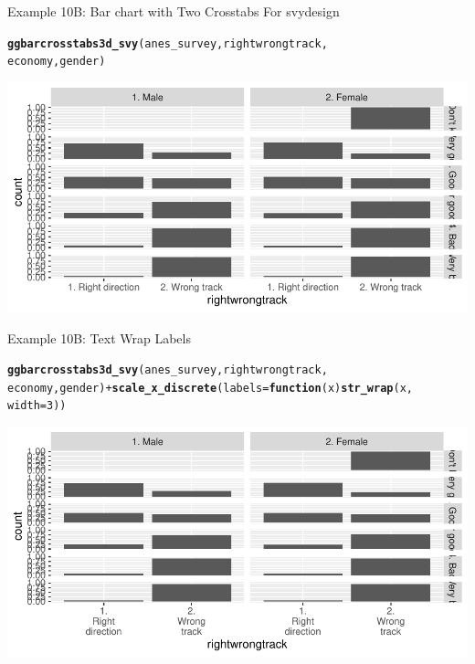 \documentclass{beamer}\usepackage[]{graphicx}\usepackage[]{color}
\makeatletter
\newcommand{\hlnum}[1]{\textcolor[rgb]{0.686,0.059,0.569}{#1}}%
\newcommand{\hlopt}[1]{\textcolor[rgb]{0,0,0}{#1}}%
\newcommand{\hlstd}[1]{\textcolor[rgb]{0.345,0.345,0.345}{#1}}%
\newcommand{\hlkwa}[1]{\textcolor[rgb]{0.161,0.373,0.58}{\textbf{#1}}}%
\newcommand{\hlkwc}[1]{\textcolor[rgb]{0.333,0.667,0.333}{#1}}%
\newcommand{\hlkwd}[1]{\textcolor[rgb]{0.737,0.353,0.396}{\textbf{#1}}}%
\newenvironment{kframe}{%
 \def\at@end@of@kframe{}%
 \ifinner\ifhmode%
  \def\at@end@of@kframe{\end{minipage}}%
  \begin{minipage}{\columnwidth}%
 \fi\fi%
 \def\FrameCommand##1{\hskip\@totalleftmargin \hskip-\fboxsep
 \colorbox{shadecolor}{##1}\hskip-\fboxsep
     \hskip-\linewidth \hskip-\@totalleftmargin \hskip\columnwidth}%
 \MakeFramed {\advance\hsize-\width
   \@totalleftmargin\z@ \linewidth\hsize
   \@setminipage}}%
 {\par\unskip\endMakeFramed%
 \at@end@of@kframe}
\newenvironment{knitrout}{}{} %
\makeatother
\begin{document}
\begin{frame}[fragile]{Example 10B: Bar chart with Two Crosstabs For svydesign}

\begin{knitrout}
\color{fgcolor}\begin{kframe}
\begin{alltt}
\hlkwd{ggbarcrosstabs3d_svy}\hlstd{(anes_survey, rightwrongtrack,}
    \hlstd{economy, gender)}
\end{alltt}
\end{kframe}
\includegraphics[width=0.95\linewidth]{figure/unnamed-chunk-42-1} 
\end{knitrout}
\end{frame}

\begin{frame}[fragile]{Example 10B: Text Wrap Labels}

\begin{knitrout}
\color{fgcolor}\begin{kframe}
\begin{alltt}
\hlkwd{ggbarcrosstabs3d_svy}\hlstd{(anes_survey, rightwrongtrack,}
    \hlstd{economy, gender)} \hlopt{+} \hlkwd{scale_x_discrete}\hlstd{(}\hlkwc{labels} \hlstd{=} \hlkwa{function}\hlstd{(}\hlkwc{x}\hlstd{)} \hlkwd{str_wrap}\hlstd{(x,}
    \hlkwc{width} \hlstd{=} \hlnum{3}\hlstd{))}
\end{alltt}
\end{kframe}
\includegraphics[width=0.95\linewidth]{figure/unnamed-chunk-43-1} 
\end{knitrout}
\end{frame}
\end{document}
